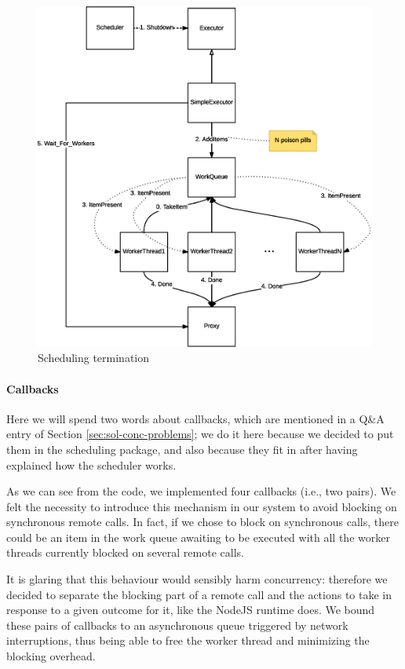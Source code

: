 \begin{figure}[H]
\centering
\includegraphics[scale=0.5,keepaspectratio]{images/solution/app/backend/scheduling-termination.eps}
\caption{Scheduling termination}
\label{fig:schedule-termination}
\end{figure}

\paragraph{Callbacks}

Here we will spend two words about callbacks, which are mentioned in a Q\&A
entry of Section \ref{sec:sol-conc-problems}; we do it here because we decided
to put them in the scheduling package, and also because they fit in after
having explained how the scheduler works.

As we can see from the code, we implemented four callbacks (i.e., two pairs).
We felt the necessity to introduce this mechanism in our system to avoid
blocking on synchronous remote calls.
In fact, if we chose to block on synchronous calls, there could be an item in
the work queue awaiting to be executed with all the worker threads currently
blocked on several remote calls.

It is glaring that this behaviour would sensibly harm concurrency: therefore we
decided to separate the blocking part of a remote call and the actions to take
in response to a given outcome for it, like the NodeJS runtime does.
We bound these pairs of callbacks to an asynchronous queue triggered by network
interruptions, thus being able to free the worker thread and minimizing the
blocking overhead.
